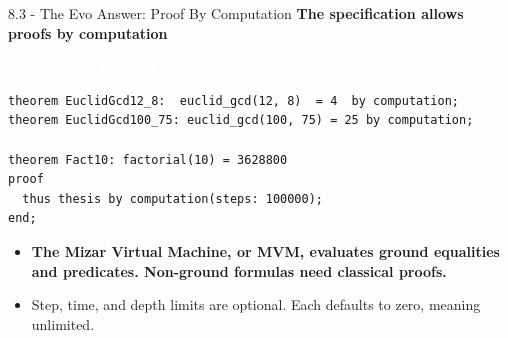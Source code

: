 \documentclass[aspectratio=169,11pt]{beamer}
\newcommand{\statusbadge}[2]{\colorbox{#1}{\textcolor{white}{\strut\scriptsize\sffamily\bfseries #2}}}
\newcommand{\badgeSpec}{\statusbadge{green!35!black}{specification example}}
\begin{document}
\begin{frame}[fragile,t]{8.3 - The Evo Answer: Proof By Computation}
\smallskip
\textbf{\textcolor{blue!55!black}{\textbf{The specification allows proofs by computation}}}~\badgeSpec
\begin{lstlisting}[language={mizar},basicstyle=\ttfamily\small]
theorem EuclidGcd12_8:  euclid_gcd(12, 8)  = 4  by computation;
theorem EuclidGcd100_75: euclid_gcd(100, 75) = 25 by computation;

theorem Fact10: factorial(10) = 3628800
proof
  thus thesis by computation(steps: 100000);
end;
\end{lstlisting}
\begin{itemize}
\setlength{\itemsep}{1pt}
\setlength{\parsep}{0pt}
\setlength{\parskip}{0pt}
\item \textcolor{blue!55!black}{\textbf{The Mizar Virtual Machine, or MVM, evaluates ground equalities and predicates. Non-ground formulas need classical proofs.}}
\item Step, time, and depth limits are optional. Each defaults to zero, meaning unlimited.
\end{itemize}
\end{frame}
\end{document}
